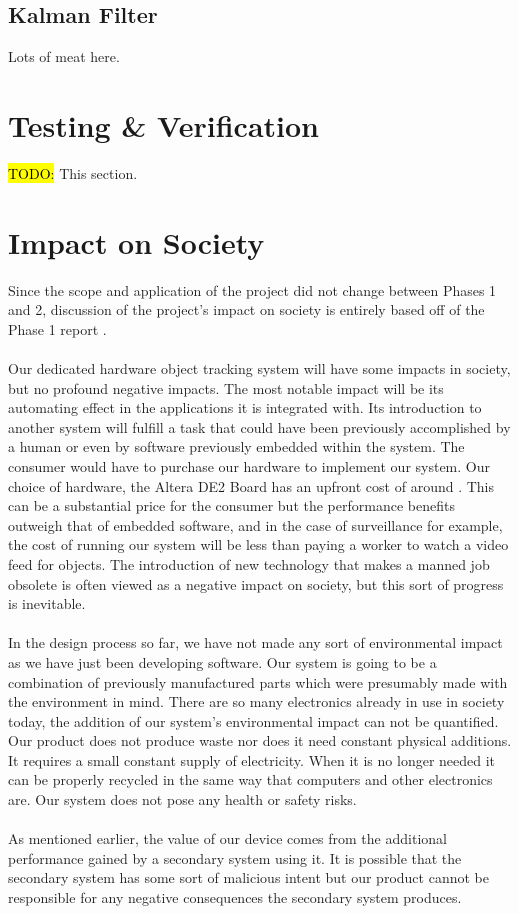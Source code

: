\documentclass[11pt]{article} %
\begin{document}
\subsection{Kalman Filter}
Lots of meat here.
\section{Testing \& Verification}
\hl{TODO:} This section.
\section{Impact on Society}
Since the scope and application of the project did not change between Phases 1 and 2, discussion of the project's impact on society is entirely based off of the Phase 1 report \cite{15}. \\\\
Our dedicated hardware object tracking system will have some impacts in society, but no profound negative impacts. The most notable impact will be its automating effect in the applications it is integrated with. Its introduction to another system will fulfill a task that could have been previously accomplished by a human or even by software previously embedded within the system. The consumer would have to purchase our hardware to implement our system. Our choice of hardware, the Altera DE2 Board has an upfront cost of around . This can be a substantial price for the consumer but the performance benefits outweigh that of embedded software, and in the case of surveillance for example, the cost of running our system will be less than paying a worker to watch a video feed for objects. The introduction of new technology that makes a manned job obsolete is often viewed as a negative impact on society, but this sort of progress is inevitable. \\\\
In the design process so far, we have not made any sort of environmental impact as we have just been developing software. Our system is going to be a combination of previously manufactured parts which were presumably made with the environment in mind. There are so many electronics already in use in society today, the addition of our system's environmental impact can not be quantified. Our product does not produce waste nor does it need constant physical additions. It requires a small constant supply of electricity. When it is no longer needed it can be properly recycled in the same way that computers and other electronics are. Our system does not pose any health or safety risks.\\\\
As mentioned earlier, the value of our device comes from the additional performance gained by a secondary system using it. It is possible that the secondary system has some sort of malicious intent but our product cannot be responsible for any negative consequences the secondary system produces. 
\end{document}
